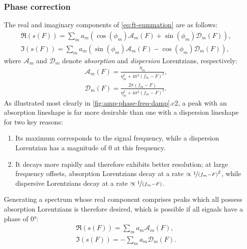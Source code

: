 \subsubsection{Phase correction}
The real and imaginary components of \cref{eq:ft-summation} are as follows:
\begin{subequations}
    \begin{gather}
        \Re(s(F)) = \sum_m
        a_m (\cos(\phi_m) \mathcal{A}_m(F) + \sin(\phi_m) \mathcal{D}_m(F)),\\
        \Im(s(F)) = \sum_m
        a_m (\sin(\phi_m) \mathcal{A}_m(F) - \cos(\phi_m) \mathcal{D}_m(F)),
    \end{gather}
\end{subequations}
where $\mathcal{A}_m$ and  $\mathcal{D}_m$ denote \emph{absorption} and
\emph{dispersion} Lorentzians, respectively:
\begin{subequations}
    \begin{gather}
        \mathcal{A}_m(F) = \frac{\eta_m}{\eta_m^2 + 4 \pi^2 (f_m - F)^2},\\
        \mathcal{D}_m(F) = \frac{2 \pi (f_m - F)}{\eta_m^2 + 4 \pi^2 (f_m - F)^2}.
    \end{gather}
\end{subequations}
As illustrated most clearly in \cref{fig:amp-phase-freq-damp}.c2, a peak with
an absorption lineshape is far more desirable than one with a dispersion
lineshape for two key reasons:
\begin{enumerate}
    \item Its maximum corresponds to the signal frequency, while a dispersion
        Lorentzian has a magnitude of $0$ at this frequency.
    \item It decays more rapidly and therefore exhibits better resolution;
        at large frequency offsets, absorption Lorentzians decay at a rate
        $\propto \nicefrac{1}{(f_m - F)}^2$, while dispersive Lorentzians
        decay at a rate $\propto \nicefrac{1}{(f_m - F)}$.
\end{enumerate}
Generating a spectrum whose real component comprises peaks which all possess
absorption Lorentzians is therefore desired, which is possible if all signals
have a phase of \ang{0}:
\begin{subequations}
    \begin{gather}
        \Re(s(F)) = \sum_m a_m \mathcal{A}_m(F),\label{eq:absorption}\\
        \Im(s(F)) = -\sum_m a_m \mathcal{D}_m(F).\label{eq:dispersion}
    \end{gather}
\end{subequations}
